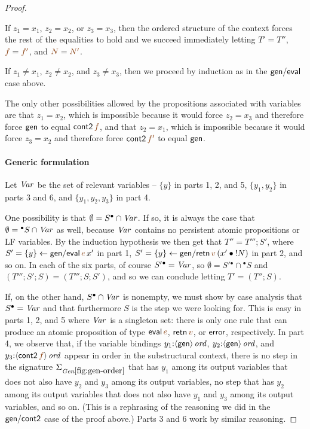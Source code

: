 \begin{proof}
\begin{description}
    If $z_1 = x_1$, $z_2 = x_2$, or $z_3 = x_3$, then the ordered
    structure of the context forces the rest of the equalities to hold
    and we succeed immediately letting $T' = T''$, $\lf{f} = \lf{f'}$, and
    $\lf{N} = \lf{N'}$. 

    \medskip If $z_1 \neq x_1$, $z_2 \neq x_2$, and $z_3 \neq x_3$,
    then we proceed by induction as in the ${\sf gen/eval}$ case
    above.
  
    \medskip The only other possibilities allowed by the propositions
    associated with variables are that $z_1 = x_2$, which is impossible
    because it would force $z_2 = x_3$ and therefore force
    $\sf{gen}$ to equal ${\sf cont2}\,\lf{f}$, and that $z_2 = x_1$, which
    is impossible because it would force $z_3 = x_2$ and therefore force
    ${\sf cont2}\,\lf{f'}$ to equal ${\sf gen}$. 

  \end{description}


  \paragraph{Generic formulation}

  Let ${\it Var}$ be the set of relevant variables -- $\{y\}$ in parts
  1, 2, and 5, $\{y_1, y_2\}$ in parts 3 and 6, and $\{y_1,y_2,y_3\}$
  in part 4.

  One possibility is that $\emptyset = S^{\bullet} \cap {\it Var}$. If so, it
  is always the case that $\emptyset = {^{\bullet}S} \cap {\it Var}$ as well,
  because ${\it Var}$ contains no persistent atomic propositions or LF
  variables. By the induction hypothesis we then get that $T'' = T''';
  S'$, where $S' = \trstep{y}{{\sf gen/eval}\,\lf{e}\,x'}$ in part 1,
  $S' = \trstep{y}{{\sf gen/retn}\,\lf{v}\,(\tfuser{x'}{\tbangr{N}})}$
  in part 2, and so on.  In each of the six parts, of course
  $S'{^\bullet} = {\it Var}$, so $\emptyset = S'{^\bullet} \cap {^\bullet}S$
  and $\left(T'''; S'; S\right) = \left(T'''; S; S'\right)$, and so we can
  conclude letting $T' = \left(T''; S\right)$.

  If, on the other hand, $S^{\bullet} \cap {\it Var}$ is nonempty, we
  must show by case analysis that $S^{\bullet} = {\it Var}$ and that
  furthermore $S$ is the step we were looking for. This is easy in
  parts 1, 2, and 5 where ${\it Var}$ is a singleton set: there is
  only one rule that can produce an atomic proposition of type ${\sf
    eval}\,\lf{e}$, ${\sf retn}\,\lf{v}$, or ${\sf error}$,
  respectively.  In part 4, we observe that, if the variable bindings
  $y_1{:}{\langle {{\sf gen}} \rangle}\,{{\it ord}}$, $y_2{:}{\langle {{\sf
        gen}} \rangle}\,{{\it ord}}$, and $y_3{:}\istrue{\susp{{\sf cont2}\,\lf{f}}}$
  appear in order in the substructural context, there is no step in
  the signature $\siggenorder$ that has $y_1$ among its output
  variables that does not also have $y_2$ and $y_3$ among its output
  variables, no step that has $y_2$ among its output variables that
  does not also have $y_1$ and $y_3$ among its output variables, and
  so on. (This is a rephrasing of the reasoning we did in the ${\sf
    gen/cont2}$ case of the proof above.) Parts 3 and 6 work by
  similar reasoning.
\end{proof}

